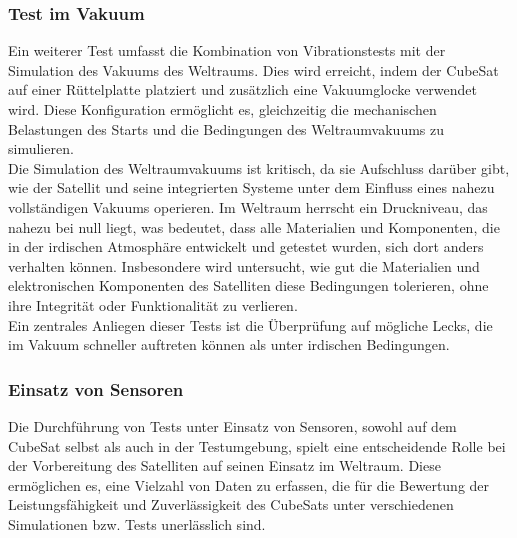\subsubsection{Test im Vakuum}
Ein weiterer Test umfasst die Kombination von Vibrationstests mit der Simulation des Vakuums des Weltraums. Dies wird erreicht, indem der CubeSat auf einer Rüttelplatte platziert und zusätzlich eine Vakuumglocke verwendet wird. Diese Konfiguration ermöglicht es, gleichzeitig die mechanischen Belastungen des Starts und die Bedingungen des Weltraumvakuums zu simulieren.\\
\vspace{2mm}
Die Simulation des Weltraumvakuums ist kritisch, da sie Aufschluss darüber gibt, wie der Satellit und seine integrierten Systeme unter dem Einfluss eines nahezu vollständigen Vakuums operieren. Im Weltraum herrscht ein Druckniveau, das nahezu bei null liegt, was bedeutet, dass alle Materialien und Komponenten, die in der irdischen Atmosphäre entwickelt und getestet wurden, sich dort anders verhalten können. Insbesondere wird untersucht, wie gut die Materialien und elektronischen Komponenten des Satelliten diese Bedingungen tolerieren, ohne ihre Integrität oder Funktionalität zu verlieren.\\
\vspace{2mm}
Ein zentrales Anliegen dieser Tests ist die Überprüfung auf mögliche Lecks, die im Vakuum schneller auftreten können als unter irdischen Bedingungen.


\subsubsection{Einsatz von Sensoren}
Die Durchführung von Tests unter Einsatz von Sensoren, sowohl auf dem CubeSat selbst als auch in der Testumgebung, spielt eine entscheidende Rolle bei der Vorbereitung des Satelliten auf seinen Einsatz im Weltraum. Diese ermöglichen es, eine Vielzahl von Daten zu erfassen, die für die Bewertung der Leistungsfähigkeit und Zuverlässigkeit des CubeSats unter verschiedenen Simulationen bzw. Tests unerlässlich sind.

